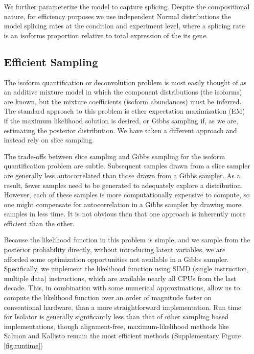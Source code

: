 \documentclass[twocolumn]{article}
\begin{document}
We further parameterize the model to capture splicing. Despite the
compositional nature, for efficiency purposes we use independent Normal
distributions the model splicing rates at the condition and experiment
level, where a splicing rate is an isoforms proportion relative to total
expression of the its gene.

\subsection{Efficient Sampling}\label{efficient-sampling}

The isoform quantification or deconvolution problem is most easily
thought of as an additive mixture model in which the component
distributions (the isoforms) are known, but the mixture coefficients
(isoform abundances) must be inferred. The standard approach to this
problem is ether expectation maximization (EM) if the maximum likelihood
solution is desired, or Gibbs sampling if, as we are, estimating the
posterior distribution. We have taken a different approach and instead
rely on slice sampling.

The trade-offs between slice sampling and Gibbs sampling for the isoform
quantification problem are subtle. Subsequent samples drawn from a slice
sampler are generally less autocorrelated than those drawn from a Gibbs
sampler. As a result, fewer samples need to be generated to adequately
explore a distribution. However, each of these samples is more
computationally expensive to compute, so one might compensate for
autocorrelation in a Gibbs sampler by drawing more samples in less time.
It is not obvious then that one approach is inherently more efficient
than the other.

Because the likelihood function in this problem is simple, and we sample
from the posterior probability directly, without introducing latent
variables, we are afforded some optimization opportunities not available
in a Gibbs sampler. Specifically, we implement the likelihood function
using SIMD (single instruction, multiple data) instructions, which are
available nearly all CPUs from the last decade. This, in combination
with some numerical approximations, allow us to compute the likelihood
function over an order of magnitude faster on conventional hardware,
than a more straightforward implementation. Run time for Isolator is generally
significantly less than that of other sampling based implementations, though
alignment-free, maximum-likelihood methods like Salmon and Kallisto remain the
most efficient methods (Supplementary Figure \ref{fig:runtime})
\end{document}
